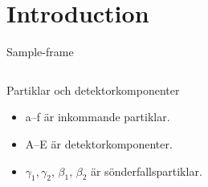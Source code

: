 \section{Introduction}

\begin{frame}{Sample-frame}
    \begin{columns}
      \begin{column}{0.35\textwidth}
        \begin{block}{Partiklar och detektorkomponenter}
        \begin{itemize}
        \item a--f är inkommande partiklar.
        \item A--E är detektorkomponenter.
        \item $\gamma_1, \gamma_2$, $\beta_1$, $\beta_2$ är sönderfallspartiklar.
        \end{itemize}
        \end{block}
      \end{column}
    \end{columns}
\end{frame}
